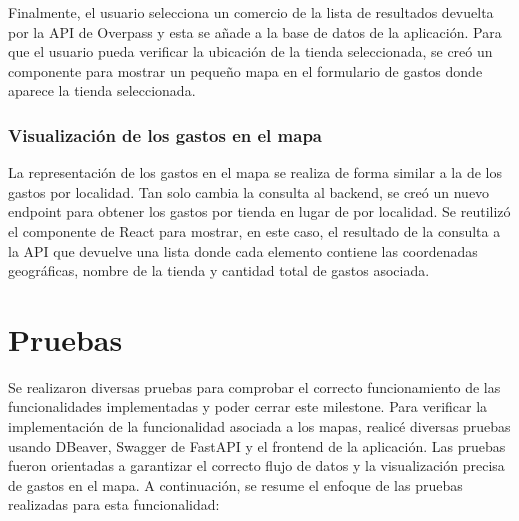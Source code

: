 Finalmente, el usuario selecciona un comercio de la lista de resultados devuelta por la API de Overpass y esta se añade a la base de datos de la aplicación. Para que el usuario pueda verificar la ubicación de la tienda seleccionada, se creó un componente para mostrar un pequeño mapa en el formulario de gastos donde aparece la tienda seleccionada.

\subsubsection{Visualización de los gastos en el mapa}
La representación de los gastos en el mapa se realiza de forma similar a la de los gastos por localidad. Tan solo cambia la consulta al backend, se creó un nuevo endpoint para obtener los gastos por tienda en lugar de por localidad. Se reutilizó el componente de React para mostrar, en este caso, el resultado de la consulta a la API que devuelve una lista donde cada elemento contiene las coordenadas geográficas, nombre de la tienda y cantidad total de gastos asociada.

\section{Pruebas}
Se realizaron diversas pruebas para comprobar el correcto funcionamiento de las funcionalidades implementadas y poder cerrar este milestone. 
Para verificar la implementación de la funcionalidad asociada a los mapas, realicé diversas pruebas usando DBeaver, Swagger de FastAPI y el frontend de la aplicación. Las pruebas fueron orientadas a garantizar el correcto flujo de datos y la visualización precisa de gastos en el mapa. A continuación, se resume el enfoque de las pruebas realizadas para esta funcionalidad:

